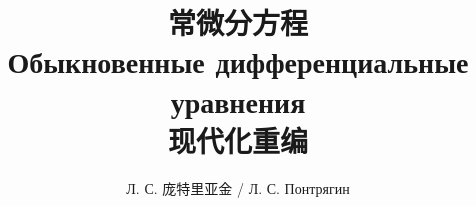 \documentclass[UTF8,zihao=-4,openany,fontset=fandol]{ctexbook}
\title{常微分方程\\{\coverru Обыкновенные дифференциальные уравнения}\\[0.5em]\large 现代化重编}
\author{{\coverru Л. С.} 庞特里亚金 / {\coverru Л. С. Понтрягин}}
\date{}
\numberwithin{equation}{chapter}
\begin{document}
\frontmatter



\tableofcontents
\let\odeSavedClearDoublePage\cleardoublepage
\let\cleardoublepage\clearpage
\mainmatter
\let\cleardoublepage\odeSavedClearDoublePage


\end{document}
